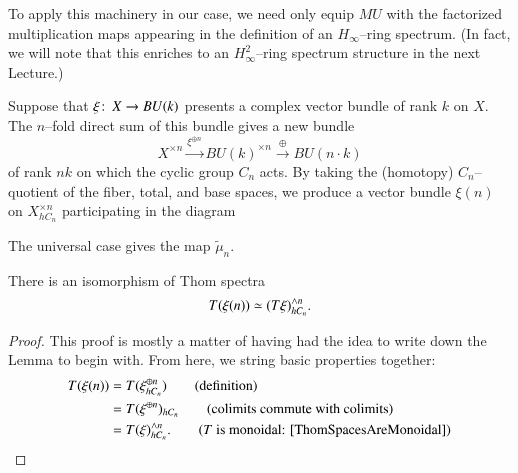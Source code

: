 To apply this machinery in our case, we need only equip $MU$ with the factorized multiplication maps appearing in the definition of an $H_\infty$--ring spectrum.  (In fact, we will note that this enriches to an  $H_\infty^2$--ring spectrum structure in the next Lecture.)

\begin{definition}
Suppose that $\xi\colon\thinspace X \to BU(k)$ presents a complex vector bundle of rank $k$ on $X$.  The $n$--fold direct sum of this bundle gives a new bundle \[X^{\times n} \xrightarrow{\xi^{\oplus n}} BU(k)^{\times n} \xrightarrow{\oplus} BU(n \cdot k)\] of rank $nk$ on which the cyclic group $C_n$ acts.  By taking the (homotopy) $C_n$--quotient of the fiber, total, and base spaces, we produce a vector bundle $\xi(n)$ on $X^{\times n}_{hC_n}$ participating in the diagram
\begin{center}
\end{center}
The universal case gives the map $\widetilde \mu_n$.
\end{definition}

\begin{lemma}\label{ThomSpectrumOfAssocBundle}
There is an isomorphism of Thom spectra \[T(\xi(n)) \simeq (T\xi)^{\wedge n}_{hC_n}.\]
\end{lemma}
\begin{proof}
This proof is mostly a matter of having had the idea to write down the Lemma to begin with.  From here, we string basic properties together:
\begin{align*}
T(\xi(n)) & = T(\xi^{\oplus n}_{hC_n}) \tag{definition} \\
& = T(\xi^{\oplus n})_{hC_n} \tag{colimits commute with colimits} \\
& = T(\xi)^{\sm n}_{hC_n}. \tag{$T$ is monoidal: \Cref{ThomSpacesAreMonoidal}}
\end{align*}
\end{proof}

